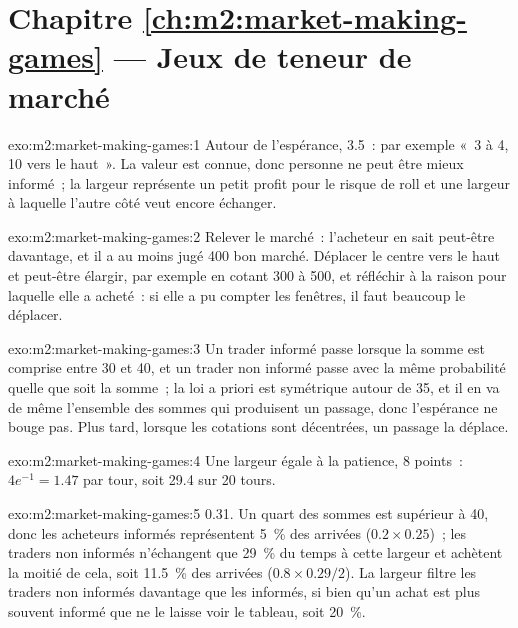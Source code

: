 \section*{Chapitre \ref{ch:m2:market-making-games} --- Jeux de teneur de marché}

\begin{solution}{exo:m2:market-making-games:1}
Autour de l'espérance, 3.5~: par exemple «~3 à 4, 10 vers le haut~». La valeur est connue, donc personne
ne peut être mieux informé~; la largeur représente un petit profit pour le risque de roll et une
largeur à laquelle l'autre côté veut encore échanger.
\end{solution}

\begin{solution}{exo:m2:market-making-games:2}
Relever le marché~: l'acheteur en sait peut-être davantage, et il a au moins jugé 400 bon marché. Déplacer
le centre vers le haut et peut-être élargir, par exemple en cotant 300 à 500, et réfléchir à la raison pour laquelle elle a acheté~:
si elle a pu compter les fenêtres, il faut beaucoup le déplacer.
\end{solution}

\begin{solution}{exo:m2:market-making-games:3}
Un trader informé passe lorsque la somme est comprise entre 30 et 40, et un trader non informé passe
avec la même probabilité quelle que soit la somme~; la loi a priori est symétrique autour de 35, et il en va de même
l'ensemble des sommes qui produisent un passage, donc l'espérance ne bouge pas. Plus tard, lorsque les cotations sont
décentrées, un passage la déplace.
\end{solution}

\begin{solution}{exo:m2:market-making-games:4}
Une largeur égale à la patience, 8 points~: $4e^{-1} = 1.47$ par tour, soit 29.4 sur 20 tours.
\end{solution}

\begin{solution}{exo:m2:market-making-games:5}
0.31. Un quart des sommes est supérieur à 40, donc les acheteurs informés représentent 5~\% des arrivées
($0.2 \times 0.25$)~; les traders non informés n'échangent que 29~\% du temps à cette largeur et achètent
la moitié de cela, soit 11.5~\% des arrivées ($0.8 \times 0.29 / 2$). La largeur filtre les traders non informés
davantage que les informés, si bien qu'un achat est plus souvent informé que ne le laisse voir le tableau, soit 20~\%.
\end{solution}

